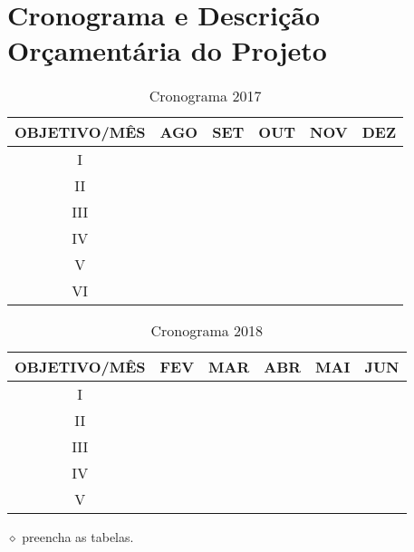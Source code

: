 \documentclass[
	12pt,				%
	openright,			%
	oneside,			%
	a4paper,			%
	english,			%
	french,				%
	spanish,			%
	brazil,				%
	]{abntex2}
\newcommand{\danielobs}[1]{{\color{red} $\diamond$ #1}}
\begin{document}
\section*{Cronograma e Descrição Orçamentária do Projeto}
	\begin{table}[h!]
		\centering
		\caption{Cronograma 2017}
		\label{my-label}
		\begin{tabular}{|c|c|c|c|c|c|}
			\hline
			OBJETIVO/MÊS & AGO & SET & OUT & NOV & DEZ \\ \hline
			I &  & & & & \\ \hline
			II &  & & & & \\ \hline
			III &  & & & & \\ \hline
			IV &  & & & & \\ \hline
			V &  & & & & \\ \hline
			VI &  & & & & \\ \hline
		\end{tabular}
	\end{table}

	\begin{table}[h!]
	\centering
	\caption{Cronograma 2018}
	\label{my-label}
	\begin{tabular}{|c|c|c|c|c|c|}
		\hline
		OBJETIVO/MÊS & FEV & MAR & ABR & MAI & JUN \\ \hline
		I &  & & & & \\ \hline
		II &  & & & & \\ \hline
		III &  & & & & \\ \hline
		IV &  & & & & \\ \hline
		V &  & & & & \\ \hline
	\end{tabular}
\end{table}

\danielobs{preencha as tabelas.}


\end{document}

